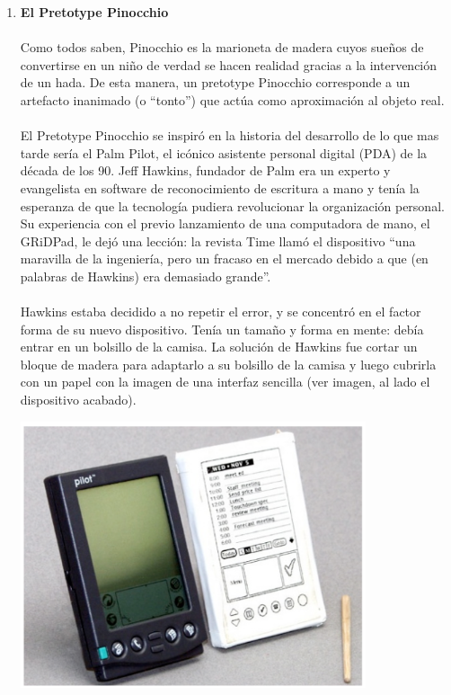 \documentclass{article}
\begin{document}
\begin{enumerate}
\item \textbf{El Pretotype Pinocchio}
\\ \\
Como todos saben, Pinocchio es la marioneta de madera cuyos sue\~nos de convertirse en un ni\~no de verdad se hacen realidad gracias a la intervenci\'on de un hada. De esta manera, un pretotype Pinocchio corresponde a un artefacto inanimado (o ``tonto'') que act\'ua como aproximaci\'on al objeto real.
\\ \\
El Pretotype Pinocchio se inspir\'o en la historia del desarrollo de lo que mas tarde ser\'ia el Palm Pilot, el ic\'onico asistente personal digital (PDA) de la d\'ecada de los 90. Jeff Hawkins, fundador de Palm era un experto y evangelista en software de reconocimiento de escritura a mano y ten\'ia la esperanza de que la tecnolog\'ia pudiera revolucionar la organizaci\'on personal. Su experiencia con el previo lanzamiento de una computadora de mano, el GRiDPad, le dej\'o una lecci\'on: la revista Time llam\'o el dispositivo ``una maravilla de la ingenier\'ia, pero un fracaso en el mercado debido a que (en palabras de Hawkins) era demasiado grande''.
\\ \\
Hawkins estaba decidido a no repetir el error, y se concentr\'o en el factor forma de su nuevo dispositivo. Ten\'ia un tama\~no y forma en mente: deb\'ia entrar en un bolsillo de la camisa. La soluci\'on de Hawkins fue cortar un bloque de madera para adaptarlo a su bolsillo de la camisa y luego cubrirla con un papel con la imagen de una interfaz sencilla (ver imagen, al lado el dispositivo acabado).

\begin{center}
    \includegraphics[width=0.8\textwidth]{palm_pilot}
\end{center}


\end{enumerate}
\end{document}
